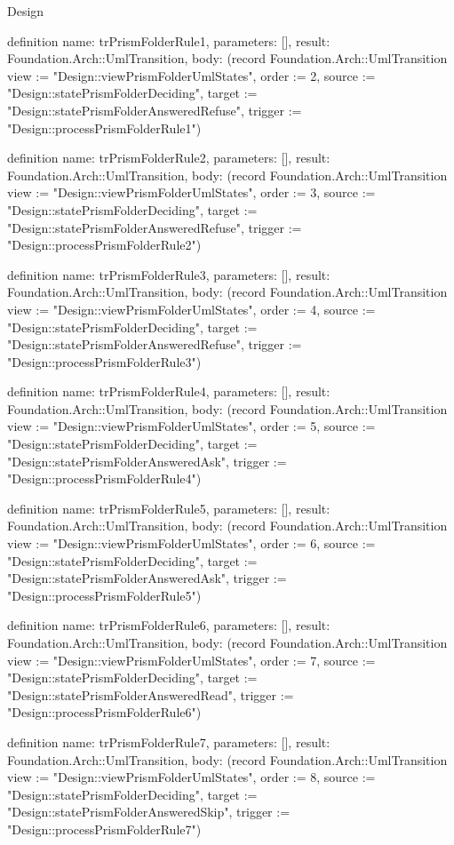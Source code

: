 \begin{lexlean}{Design}
\begin{semanticmodule}
definition{
  name: trPrismFolderRule1,
  parameters: [],
  result: Foundation.Arch::UmlTransition,
  body: (record Foundation.Arch::UmlTransition {view := "Design::viewPrismFolderUmlStates", order := 2, source := "Design::statePrismFolderDeciding", target := "Design::statePrismFolderAnsweredRefuse", trigger := "Design::processPrismFolderRule1"})
}

definition{
  name: trPrismFolderRule2,
  parameters: [],
  result: Foundation.Arch::UmlTransition,
  body: (record Foundation.Arch::UmlTransition {view := "Design::viewPrismFolderUmlStates", order := 3, source := "Design::statePrismFolderDeciding", target := "Design::statePrismFolderAnsweredRefuse", trigger := "Design::processPrismFolderRule2"})
}

definition{
  name: trPrismFolderRule3,
  parameters: [],
  result: Foundation.Arch::UmlTransition,
  body: (record Foundation.Arch::UmlTransition {view := "Design::viewPrismFolderUmlStates", order := 4, source := "Design::statePrismFolderDeciding", target := "Design::statePrismFolderAnsweredRefuse", trigger := "Design::processPrismFolderRule3"})
}

definition{
  name: trPrismFolderRule4,
  parameters: [],
  result: Foundation.Arch::UmlTransition,
  body: (record Foundation.Arch::UmlTransition {view := "Design::viewPrismFolderUmlStates", order := 5, source := "Design::statePrismFolderDeciding", target := "Design::statePrismFolderAnsweredAsk", trigger := "Design::processPrismFolderRule4"})
}

definition{
  name: trPrismFolderRule5,
  parameters: [],
  result: Foundation.Arch::UmlTransition,
  body: (record Foundation.Arch::UmlTransition {view := "Design::viewPrismFolderUmlStates", order := 6, source := "Design::statePrismFolderDeciding", target := "Design::statePrismFolderAnsweredAsk", trigger := "Design::processPrismFolderRule5"})
}

definition{
  name: trPrismFolderRule6,
  parameters: [],
  result: Foundation.Arch::UmlTransition,
  body: (record Foundation.Arch::UmlTransition {view := "Design::viewPrismFolderUmlStates", order := 7, source := "Design::statePrismFolderDeciding", target := "Design::statePrismFolderAnsweredRead", trigger := "Design::processPrismFolderRule6"})
}

definition{
  name: trPrismFolderRule7,
  parameters: [],
  result: Foundation.Arch::UmlTransition,
  body: (record Foundation.Arch::UmlTransition {view := "Design::viewPrismFolderUmlStates", order := 8, source := "Design::statePrismFolderDeciding", target := "Design::statePrismFolderAnsweredSkip", trigger := "Design::processPrismFolderRule7"})
}


\end{semanticmodule}
\end{lexlean}
